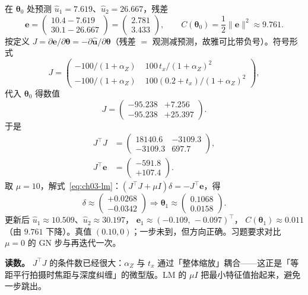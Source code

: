 在 $\boldsymbol\theta_0$ 处预测 $\hat u_1=7.619$、$\hat u_2=26.667$，残差
\[
  \boldsymbol e
  =\begin{pmatrix}10.4-7.619\\ 30.1-26.667\end{pmatrix}
  =\begin{pmatrix}2.781\\ 3.433\end{pmatrix},\qquad
  C(\boldsymbol\theta_0)=\frac12\|\boldsymbol e\|^2\approx 9.761.
\]
按定义 $J=\partial\boldsymbol e/\partial\boldsymbol\theta=-\partial\hat{\boldsymbol u}/\partial\boldsymbol\theta$（残差 $=$ 观测减预测，故雅可比带负号）。符号形式
\[
  J=\begin{pmatrix}
  -100/(1+\alpha_Z) & \;100\,t_x/(1+\alpha_Z)^2\\
  -100/(1+\alpha_Z) & \;100(0.2+t_x)/(1+\alpha_Z)^2
  \end{pmatrix},
\]
代入 $\boldsymbol\theta_0$ 得数值
\[
  J=\begin{pmatrix}-95.238 & +7.256\\ -95.238 & +25.397\end{pmatrix}.
\]
于是
\begin{align*}
  J^\top J&=\begin{pmatrix}18140.6 & -3109.3\\ -3109.3 & 697.7\end{pmatrix},\\
  J^\top\boldsymbol e&=\begin{pmatrix}-591.8\\ +107.4\end{pmatrix}.
\end{align*}
取 $\mu=10$，解式~\eqref{eq:ch03-lm}：$(J^\top J+\mu I)\delta=-J^\top\boldsymbol e$，得
\[
  \delta\approx\begin{pmatrix}+0.0268\\ -0.0342\end{pmatrix}
  \Rightarrow
  \boldsymbol\theta_1\approx\begin{pmatrix}0.1068\\ 0.0158\end{pmatrix}.
\]
更新后 $\hat u_1\approx10.509$、$\hat u_2\approx30.197$，
$\boldsymbol e_1\approx(-0.109,\,-0.097)^\top$，
$C(\boldsymbol\theta_1)\approx0.011$（由 $9.761$ 下降）。真值 $(0.10,0)$；一步未到，但方向正确。习题要求对比 $\mu=0$ 的 GN 步与再迭代一次。

\textbf{读数。} $J^\top J$ 的条件数已经很大：$\alpha_Z$ 与 $t_x$ 通过「整体缩放」耦合——这正是「等距平行拍摄时焦距与深度纠缠」的微型版。LM 的 $\mu I$ 把最小特征值抬起来，避免一步跳出。

